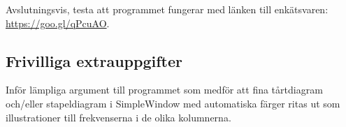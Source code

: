\Task Avslutningsvis, testa att programmet fungerar med länken till enkätsvaren: \url{https://goo.gl/qPcuAO}.

\subsection{Frivilliga extrauppgifter}
    
\Task Inför lämpliga argument till programmet som medför att fina tårtdiagram och/eller stapeldiagram i SimpleWindow med automatiska färger ritas ut som illustrationer till frekvenserna i de olika kolumnerna.
